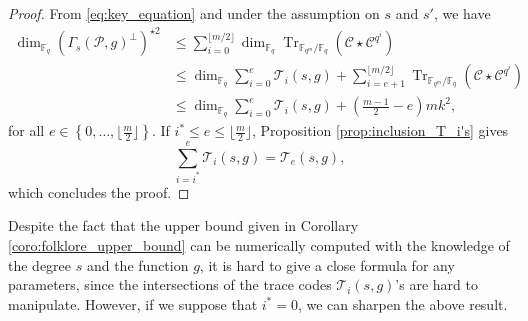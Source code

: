 \documentclass[a4paper]{article}
\newtheorem{coro}[thm]{Corollary}
\theoremstyle{definition}
\theoremstyle{remark}
\newcommand{\calP}{\mathcal{P}}
\newcommand{\calL}{\mathcal{L}}
\newcommand{\calC}{\mathcal{C}}
\newcommand{\calT}{\mathcal{T}}
\newcommand{\calX}{\mathcal{X}}
\newcommand{\fqm}{\mathbb{F}_{q^m}}
\newcommand{\fq}{\mathbb{F}_{q}}
\newcommand{\Tr}[1]{\operatorname{Tr}_{\mathbb{F}_{q^m}/\fq}\left(#1\right)}
\newcommand{\set}[1]{\left\{#1\right\}}
\newcommand\mathieu[1]{\textcolor{brown}{#1}}
\begin{document}
%
\begin{proof}
From \eqref{eq:key_equation} and under the assumption on $s$ and $s'$, we have
        \begin{align*}
        \dim_{\fq} (\Gamma_s(\calP,g)^{\perp})^{\star 2}
        & \leq \sum\limits_{i=0}^{\lfloor m/2 \rfloor} \dim_{\fq} \Tr{\calC \star                     \calC^{q^i}} \\
        & \leq \dim_{\fq} \sum\limits_{i=0}^{e}\calT_i(s,g) + \sum\limits_{i=e+1}^{\lfloor m/2 \rfloor} \Tr{\calC \star \calC^{q^i}} \\
                & \leq \dim_{\fq} \sum\limits_{i=0}^{e}\calT_i(s,g) + \left( \frac{m-1}{2} -e \right)mk^2,
        \end{align*}
 for all $e \in \set{0,\dots,\lfloor \frac{m}{2} \rfloor}$. If $i^* \leq e \leq \lfloor \frac{m}{2} \rfloor$,  Proposition \ref{prop:inclusion_T_i's} gives
\[\sum\limits_{i=i^*}^e \calT_i(s,g) = \calT_e(s,g),\]
which concludes the proof.
\end{proof}

Despite the fact that the upper bound given in Corollary \ref{coro:folklore_upper_bound} can be numerically computed with the knowledge of the degree $s$ and the function $g$, it is hard to give a close formula for any parameters, since the intersections of the trace codes $\calT_i(s,g)$'s are hard to manipulate. However, if we suppose that $i^*=0$, we can sharpen the above result.
\end{document}
